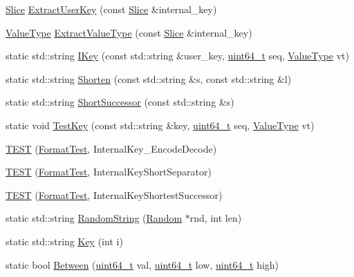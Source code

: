 \begin{DoxyCompactItemize}
\item 
\hyperlink{classleveldb_1_1_slice}{Slice} \hyperlink{namespaceleveldb_a1c889869840312393b805ad91a41b94f}{Extract\+User\+Key} (const \hyperlink{classleveldb_1_1_slice}{Slice} \&internal\+\_\+key)
\item 
\hyperlink{namespaceleveldb_acc038cb0d608414730cafa459a4ba866}{Value\+Type} \hyperlink{namespaceleveldb_a0c5a6ea40d7c0e87060a6e6d3ee393ec}{Extract\+Value\+Type} (const \hyperlink{classleveldb_1_1_slice}{Slice} \&internal\+\_\+key)
\item 
static std\+::string \hyperlink{namespaceleveldb_a129ecd3bf532c7422038a47c86f00826}{I\+Key} (const std\+::string \&user\+\_\+key, \hyperlink{stdint_8h_aaa5d1cd013383c889537491c3cfd9aad}{uint64\+\_\+t} seq, \hyperlink{namespaceleveldb_acc038cb0d608414730cafa459a4ba866}{Value\+Type} vt)
\item 
static std\+::string \hyperlink{namespaceleveldb_ac7cf47fb2e3de741ca9a5c5d3ecea061}{Shorten} (const std\+::string \&s, const std\+::string \&l)
\item 
static std\+::string \hyperlink{namespaceleveldb_a94e8c955ceebf1e1ff0cf1584cf747e3}{Short\+Successor} (const std\+::string \&s)
\item 
static void \hyperlink{namespaceleveldb_a3851e7150ed244dc0e1b85170326bd67}{Test\+Key} (const std\+::string \&key, \hyperlink{stdint_8h_aaa5d1cd013383c889537491c3cfd9aad}{uint64\+\_\+t} seq, \hyperlink{namespaceleveldb_acc038cb0d608414730cafa459a4ba866}{Value\+Type} vt)
\item 
\hyperlink{namespaceleveldb_a0cb5db14747e016f18aa8684a485bc00}{T\+E\+S\+T} (\hyperlink{classleveldb_1_1_format_test}{Format\+Test}, Internal\+Key\+\_\+\+Encode\+Decode)
\item 
\hyperlink{namespaceleveldb_a88307bc8d4ac8ed2a4d1a530b24e255f}{T\+E\+S\+T} (\hyperlink{classleveldb_1_1_format_test}{Format\+Test}, Internal\+Key\+Short\+Separator)
\item 
\hyperlink{namespaceleveldb_abfb19a8fcd10a881d34dba3821434415}{T\+E\+S\+T} (\hyperlink{classleveldb_1_1_format_test}{Format\+Test}, Internal\+Key\+Shortest\+Successor)
\item 
static std\+::string \hyperlink{namespaceleveldb_ab30792c0730ee094943e8242577454af}{Random\+String} (\hyperlink{classleveldb_1_1_random}{Random} $\ast$rnd, int len)
\item 
static std\+::string \hyperlink{namespaceleveldb_af5ebf23c4f21b4986d6f8fb430739287}{Key} (int i)
\item 
static bool \hyperlink{namespaceleveldb_a891b358b4c0a10a44b24b8f473cc73fd}{Between} (\hyperlink{stdint_8h_aaa5d1cd013383c889537491c3cfd9aad}{uint64\+\_\+t} val, \hyperlink{stdint_8h_aaa5d1cd013383c889537491c3cfd9aad}{uint64\+\_\+t} low, \hyperlink{stdint_8h_aaa5d1cd013383c889537491c3cfd9aad}{uint64\+\_\+t} high)

\end{DoxyCompactItemize}
